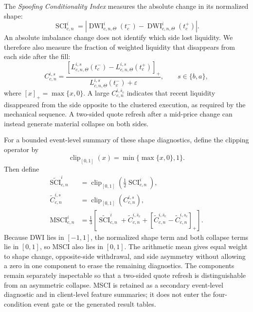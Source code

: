 \documentclass[11pt]{article}
\begin{document}
The \textit{Spoofing Conditionality Index} measures the absolute change in its normalized shape:
\begin{equation}
    \operatorname{SCI}^{i}_{c,n}
    =
    \left|
        \operatorname{DWI}^{i}_{c,n,\Theta}(t_c^{-})
        -
        \operatorname{DWI}^{i}_{c,n,\Theta}(t_c^{+})
    \right|.
    \label{eq:topn_sci}
\end{equation}
An absolute imbalance change does not identify which side lost liquidity. We therefore also measure the fraction of
weighted liquidity that disappears from each side after the fill:
\begin{equation}
    C^{i,s}_{c,n}
    =
    \frac{
        \left[
            L^{i,s}_{c,n,\Theta}(t_c^{-})-L^{i,s}_{c,n,\Theta}(t_c^{+})
        \right]_{+}
    }{
        L^{i,s}_{c,n,\Theta}(t_c^{-})+\varepsilon
    },
    \qquad s\in\{b,a\},
    \label{eq:side_collapse}
\end{equation}
where $[x]_{+}=\max\{x,0\}$. A large $C^{i,\bar{s}_c}_{c,n}$ indicates that recent liquidity disappeared from the side
opposite to the clustered execution, as required by the mechanical sequence. A two-sided quote refresh after a mid-price
change can instead generate material collapse on both sides.

For a bounded event-level summary of these shape diagnostics, define the clipping operator by
\begin{equation}
    \operatorname{clip}_{[0,1]}(x)=\min\{\max\{x,0\},1\}.
\end{equation}
Then define
\begin{equation}
\begin{aligned}
    \widetilde{\operatorname{SCI}}^{i}_{c,n}
    &=\operatorname{clip}_{[0,1]}\!\left(\frac{1}{2}\operatorname{SCI}^{i}_{c,n}\right),\\
    \widetilde C^{i,s}_{c,n}
    &=\operatorname{clip}_{[0,1]}\!\left(C^{i,s}_{c,n}\right),\\
    \operatorname{MSCI}^{i}_{c,n}
    &=\frac{1}{3}\left[
        \widetilde{\operatorname{SCI}}^{i}_{c,n}
        +\widetilde C^{i,\bar{s}_c}_{c,n}
        +\left[\widetilde C^{i,\bar{s}_c}_{c,n}-\widetilde C^{i,s_c}_{c,n}\right]_{+}
    \right].
\end{aligned}
    \label{eq:additive_msci}
\end{equation}
Because DWI lies in $[-1,1]$, the normalized shape term and both collapse terms lie in $[0,1]$, so MSCI also lies in
$[0,1]$. The arithmetic mean gives equal weight to shape change, opposite-side withdrawal, and side asymmetry without
allowing a zero in one component to erase the remaining diagnostics. The components remain separately inspectable so that
a two-sided quote refresh is distinguishable from an asymmetric collapse. MSCI is retained as a secondary event-level
diagnostic and in client-level feature summaries; it does not enter the four-condition event gate or the generated result
tables.
\end{document}

